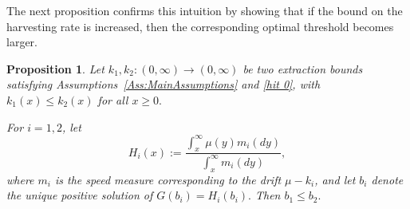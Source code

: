 \documentclass[12pt]{article}
\newtheorem{proposition}[theorem]{Proposition}
\begin{document}
The next proposition confirms this intuition by showing that if the bound on the harvesting rate is increased, then the corresponding optimal threshold becomes larger.

\begin{proposition} \label{Prop: k1k2ordering}
    Let $k_1,k_2: (0,\infty) \to (0,\infty)$ be two extraction bounds satisfying Assumptions~\ref{Ass:MainAssumptions} and \ref{hit 0}, with $k_1(x) \leq k_2(x)$ for all $x \geq 0.$
    
    For $i=1,2$, let
    \begin{equation*}
        H_i(x) := \frac{\int_x^\infty \mu(y)m_{i}(dy)}{\int_x^\infty m_{i}(dy)},
    \end{equation*}
    where $m_{i}$ is the speed measure corresponding to the drift $\mu-k_i$, and let $b_i$ denote the unique positive solution of $G(b_i) = H_i(b_i).$ Then $b_1 \leq b_2.$
\end{proposition}
\end{document}
